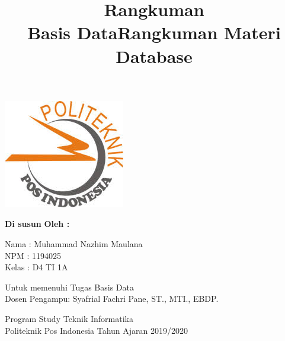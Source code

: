\documentclass[a4paper, 12pt]{article}
\title{\textbf{Rangkuman}\linebreak \\ \textbf{Basis Data}}
\date{}
\begin{document}
\maketitle
\begin{center}
\includegraphics[width=5 cm, height=5 cm]{logo.jpg}\linebreak
\end{center}
\begin{center}
\textbf{Di susun}\linebreak
\textbf{ Oleh :} \linebreak
\end{center}
\vspace{0.5 cm}
\begin{flushleft}
Nama : Muhammad Nazhim Maulana \\
NPM : 1194025 \\
Kelas : D4 TI 1A\\
\end{flushleft}
\newline
\newline
\newline
\begin{center}
Untuk memenuhi Tugas Basis Data \\
Dosen Pengampu: Syafrial Fachri Pane, ST., MTI., EBDP. \linebreak
\newline

\newline
Program Study Teknik Informatika \\
Politeknik Pos Indonesia \linebreak
Tahun Ajaran 2019/2020 \linebreak
\end{center}
\begin{center}
\title{\textbf{Rangkuman Materi Database}\linebreak}
\end{center}
\end{document}
